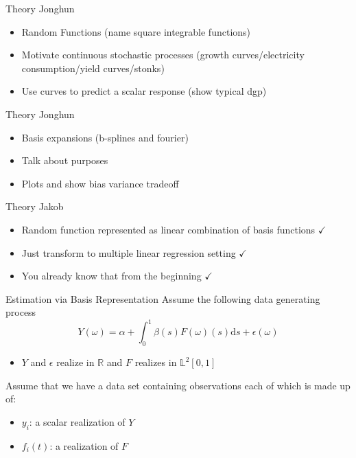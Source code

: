 \documentclass{beamer}
\begin{document}
	\begin{frame}{Theory}
		Jonghun
		\begin{itemize}
			\item Random Functions (name square integrable functions)
			\item Motivate continuous stochastic processes (growth curves/electricity consumption/yield curves/stonks)
			\item Use curves to predict a scalar response (show typical dgp)
		\end{itemize}
	\end{frame}

	\begin{frame}{Theory}
		Jonghun
		\begin{itemize}
			\item Basis expansions (b-splines and fourier)
			\item Talk about purposes
			\item Plots and show bias variance tradeoff
		\end{itemize}
	\end{frame}

	\begin{frame}{Theory}
		Jakob
		\begin{itemize}
			\item Random function represented as linear combination of basis functions $\checkmark$
			\item Just transform to multiple linear regression setting $\checkmark$
			\item You already know that from the beginning $\checkmark$
		\end{itemize}
	\end{frame}

	\begin{frame}{Estimation via Basis Representation}
		Assume the following data generating process
		$$Y(\omega) = \alpha + \int_{0}^{1} \beta(s) F(\omega)(s) \mathrm{d}s + \epsilon(\omega)$$
		\begin{itemize}
			\item $Y$ and $\epsilon$ realize in $\mathbb{R}$ and $F$ realizes in $\mathbb{L}^2[0,1]$
		\end{itemize}
		\vspace{0.2cm}
		
		Assume that we have a data set containing observations each of which is made up of:
		\begin{itemize}
			\item $y_i$: a scalar realization of $Y$
			\item $f_i(t)$: a realization of $F$
		\end{itemize}

	\end{frame}
\end{document}
